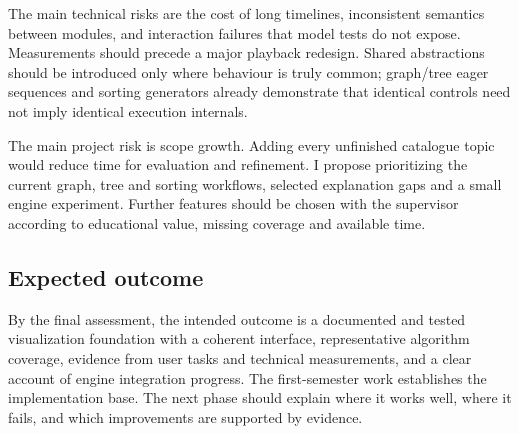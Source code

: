 \documentclass[11pt,a4paper]{article}
\newcommand{\page}{\par\vspace{8pt}}
\begin{document}
The main technical risks are the cost of long timelines, inconsistent semantics between modules, and interaction failures that model tests do not expose. Measurements should precede a major playback redesign. Shared abstractions should be introduced only where behaviour is truly common; graph/tree eager sequences and sorting generators already demonstrate that identical controls need not imply identical execution internals.

The main project risk is scope growth. Adding every unfinished catalogue topic would reduce time for evaluation and refinement. I propose prioritizing the current graph, tree and sorting workflows, selected explanation gaps and a small engine experiment. Further features should be chosen with the supervisor according to educational value, missing coverage and available time.

\subsection{Expected outcome}
By the final assessment, the intended outcome is a documented and tested visualization foundation with a coherent interface, representative algorithm coverage, evidence from user tasks and technical measurements, and a clear account of engine integration progress. The first-semester work establishes the implementation base. The next phase should explain where it works well, where it fails, and which improvements are supported by evidence.

\page
\begingroup
\small
\setlength{\parskip}{3pt}


\endgroup
\end{document}
